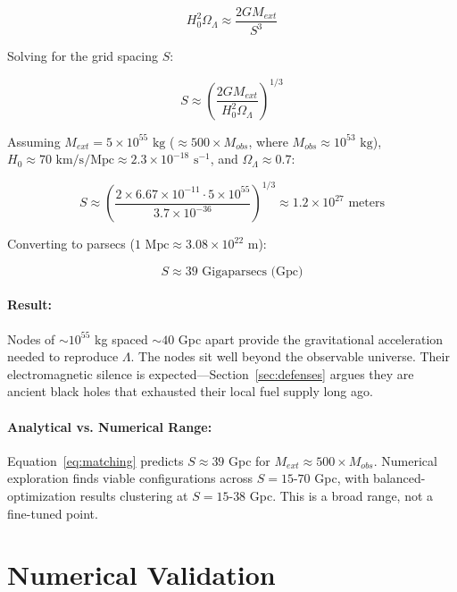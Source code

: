 \documentclass{article}
\begin{document}
\begin{equation}
H_0^2 \Omega_\Lambda \approx \frac{2 G M_{ext}}{S^3}
\label{eq:matching}
\end{equation}

Solving for the grid spacing $S$:

\begin{equation}
S \approx \left( \frac{2 G M_{ext}}{H_0^2 \Omega_\Lambda} \right)^{1/3}
\end{equation}

Assuming $M_{ext} = 5 \times 10^{55} \text{ kg}$ ($\approx 500 \times M_{obs}$, where $M_{obs} \approx 10^{53} \text{ kg}$), $H_0 \approx 70 \text{ km/s/Mpc} \approx 2.3 \times 10^{-18} \text{ s}^{-1}$, and $\Omega_\Lambda \approx 0.7$:

\begin{equation}
S \approx \left( \frac{2 \times 6.67 \times 10^{-11} \cdot 5 \times 10^{55}}{3.7 \times 10^{-36}} \right)^{1/3} \approx 1.2 \times 10^{27} \text{ meters}
\end{equation}

Converting to parsecs ($1 \text{ Mpc} \approx 3.08 \times 10^{22} \text{ m}$):

\begin{equation}
S \approx 39 \text{ Gigaparsecs (Gpc)}
\end{equation}

\paragraph{Result:} Nodes of $\sim 10^{55}$ kg spaced $\sim 40$ Gpc apart provide the gravitational acceleration needed to reproduce $\Lambda$.
The nodes sit well beyond the observable universe.
Their electromagnetic silence is expected—Section~\ref{sec:defenses} argues they are ancient black holes that exhausted their local fuel supply long ago.

\paragraph{Analytical vs. Numerical Range:}
Equation~\ref{eq:matching} predicts $S \approx 39$ Gpc for $M_{ext} \approx 500 \times M_{obs}$.
Numerical exploration finds viable configurations across $S = 15$-$70$ Gpc, with balanced-optimization results clustering at $S = 15$-$38$ Gpc. This is a broad range, not a fine-tuned point.

\section{Numerical Validation}
\label{sec:numerical}
\end{document}
